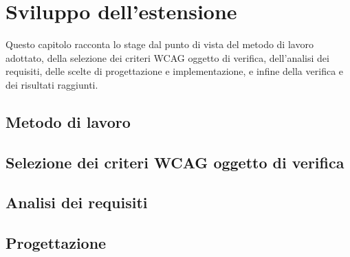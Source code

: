 \chapter{Sviluppo dell'estensione}
\label{chap:sviluppo-estensione}

Questo capitolo racconta lo stage dal punto di vista del metodo di lavoro adottato, della selezione dei criteri WCAG oggetto di verifica, dell'analisi dei requisiti, delle scelte di progettazione e implementazione, e infine della verifica e dei risultati raggiunti.

\section{Metodo di lavoro}
\label{sec:metodo-lavoro}



\section{Selezione dei criteri WCAG oggetto di verifica}
\label{sec:selezione-criteri}




\section{Analisi dei requisiti}
\label{sec:analisi-requisiti}




\section{Progettazione}
\label{sec:progettazione}

